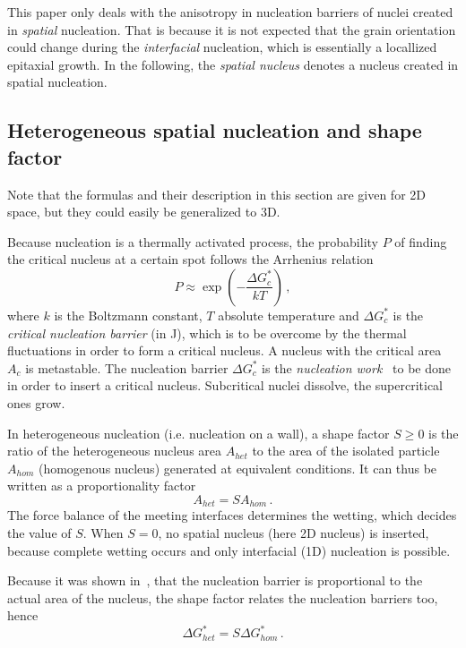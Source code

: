 	This paper only deals with the anisotropy in nucleation barriers of nuclei created in \textit{spatial} nucleation. That is because it is not expected that the grain orientation could change during the \textit{interfacial} nucleation, which is essentially a locallized epitaxial growth. In the following, the \textit{spatial nucleus} denotes a nucleus created in spatial nucleation.
	
	\subsection{Heterogeneous spatial nucleation and shape factor}    
	Note that the formulas and their description in this section are given for 2D space, but they could easily be generalized to 3D. 
	
	Because nucleation is a thermally activated process, the probability $P$ of finding the critical nucleus at a certain spot follows the Arrhenius relation
	\begin{equation}
		P \approx \exp\left(-\frac{\Delta G_c^*}{kT}\right) \,,
	\end{equation}
	where $k$ is the Boltzmann constant, $T$ absolute temperature and $\Delta G_c^*$ is the \textit{critical nucleation barrier} (in J), which is to be overcome by the thermal fluctuations in order to form a critical nucleus. A nucleus with the critical area $A_c$ is metastable. The nucleation barrier $\Delta G_c^*$ is the \textit{nucleation work}~\cite{Milchev2002} to be done in order to insert a critical nucleus. Subcritical nuclei dissolve, the supercritical ones grow.
	
	In heterogeneous nucleation (i.e. nucleation on a wall), a shape factor $S\geq0$ is the ratio of the heterogeneous nucleus area $A_{het}$ to the area of the isolated particle $A_{hom}$ (homogenous nucleus) generated at equivalent conditions. It can thus be written as a proportionality factor
	\begin{equation}
		A_{het} = SA_{hom} \,.
	\end{equation}
	The force balance of the meeting interfaces determines the wetting, which decides the value of $S$. When $S=0$, no spatial nucleus (here 2D nucleus) is inserted, because complete wetting occurs and only interfacial (1D) nucleation is possible.
	
	Because it was shown in~\cite{Mariaux2011}, that the nucleation barrier is proportional to the actual area of the nucleus, the shape factor relates the nucleation barriers too, hence
	\begin{equation}
		\Delta G^*_{het} = S\Delta G^*_{hom} \,.
	\end{equation}
	
